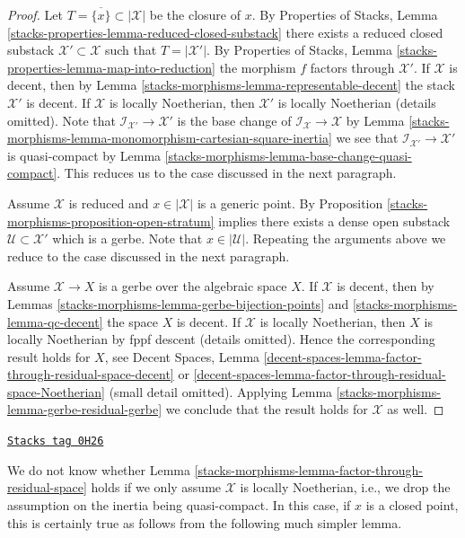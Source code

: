 \begin{proof}
Let $T = \overline{\{x\}} \subset |\mathcal{X}|$ be the closure of $x$.
By Properties of Stacks, Lemma
\ref{stacks-properties-lemma-reduced-closed-substack}
there exists a reduced closed substack $\mathcal{X}' \subset \mathcal{X}$
such that $T = |\mathcal{X}'|$. By Properties of Stacks, Lemma
\ref{stacks-properties-lemma-map-into-reduction} the
morphism $f$ factors through $\mathcal{X}'$. If $\mathcal{X}$ is decent,
then by Lemma \ref{stacks-morphisms-lemma-representable-decent} the stack
$\mathcal{X}'$ is decent. If $\mathcal{X}$ is locally Noetherian,
then $\mathcal{X}'$ is locally Noetherian (details omitted).
Note that $\mathcal{I}_{\mathcal{X}'} \to \mathcal{X}'$
is the base change of $\mathcal{I}_\mathcal{X} \to \mathcal{X}$ by
Lemma \ref{stacks-morphisms-lemma-monomorphism-cartesian-square-inertia}
we see that $\mathcal{I}_{\mathcal{X}'} \to \mathcal{X}'$ is
quasi-compact by Lemma \ref{stacks-morphisms-lemma-base-change-quasi-compact}.
This reduces us to the case discussed in the next paragraph.

\medskip\noindent
Assume $\mathcal{X}$ is reduced and $x \in |\mathcal{X}|$
is a generic point. By Proposition \ref{stacks-morphisms-proposition-open-stratum}
implies there exists a dense open substack
$\mathcal{U} \subset \mathcal{X}'$ which is a gerbe.
Note that $x \in |\mathcal{U}|$.
Repeating the arguments above we reduce to the case discussed
in the next paragraph.

\medskip\noindent
Assume $\mathcal{X} \to X$ is a gerbe over the algebraic space $X$.
If $\mathcal{X}$ is decent, then by
Lemmas \ref{stacks-morphisms-lemma-gerbe-bijection-points} and \ref{stacks-morphisms-lemma-qc-decent}
the space $X$ is decent. If $\mathcal{X}$ is locally Noetherian,
then $X$ is locally Noetherian by fppf descent (details omitted).
Hence the corresponding result holds for $X$, see Decent Spaces, Lemma
\ref{decent-spaces-lemma-factor-through-residual-space-decent} or
\ref{decent-spaces-lemma-factor-through-residual-space-Noetherian}
(small detail omitted).
Applying Lemma \ref{stacks-morphisms-lemma-gerbe-residual-gerbe} we conclude that the result
holds for $\mathcal{X}$ as well.
\end{proof}

\begin{remark}
\label{stacks-morphisms-lemma-factor-through-residual-space-Noetherian}
\href{https://stacks.math.columbia.edu/tag/0H26}{\texttt{Stacks tag 0H26}}

We do not know whether Lemma \ref{stacks-morphisms-lemma-factor-through-residual-space}
holds if we only assume $\mathcal{X}$ is locally Noetherian, i.e., we
drop the assumption on the inertia being quasi-compact. In this case,
if $x$ is a closed point, this is certainly true as follows from the
following much simpler lemma.
\end{remark}


